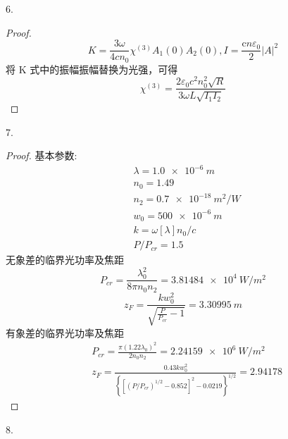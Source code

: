 \begin{exercise}
    6. 
\end{exercise}

\begin{proof}
    $$ 
K=\frac{3 \omega}{4 c n_{0}} \chi^{(3)} A_{1}(0) A_{2}(0)
, 
I=\frac{\mathrm{c} n \varepsilon_{0}}{2}|A|^{2}
$$
将 K 式中的振幅振幅替换为光强，可得
$$
\chi^{(3)}=\frac{2 \varepsilon_{0} c^{2} n_{0}^{2} \sqrt{R}}{3 \omega L \sqrt{I_{1} I_{2}}}
$$
\end{proof}
    
\begin{exercise}
    7. 
\end{exercise}

\begin{proof}
基本参数:
$$
\begin{aligned}
&\lambda= \SI{1.0e-6}{m}\\
&n_{0}=1.49\\
&n_{2}=\SI{0.7 e-18 }{m^2/W}\\
&w_{0}=\SI{500e-6}{m}\\
&k=\omega[\lambda] n_{0} / c\\
&P / P_{c r}=1.5
\end{aligned}
$$
无象差的临界光功率及焦距
$$
P_{c r}=\frac{\lambda_{0}^{2}}{8 \pi n_{0} n_{2}}=\SI{3.81484e4}{W/m^2}
$$
$$
z_{F}=\frac{k w_{0}^{2}}{\sqrt{\frac{P}{P_{c r}}-1}}=\SI{3.30995}{m}
$$
有象差的临界光功率及焦距
$$
\begin{aligned}
&P_{c r}=\frac{\pi\left(1.22 \lambda_{0}\right)^{2}}{2 n_{0} n_{2}}=\SI{2.24159e6}{W/m^2}\\
&z_{F}=\frac{0.43 k w_{0}^{2}}{\left\{\left[\left(P / P_{c r}\right)^{1 / 2}-0.852\right]^{2}-0.0219\right\}^{1 / 2}}=2.94178
\end{aligned}
$$

\end{proof}

\begin{exercise}
8. 
\end{exercise}

